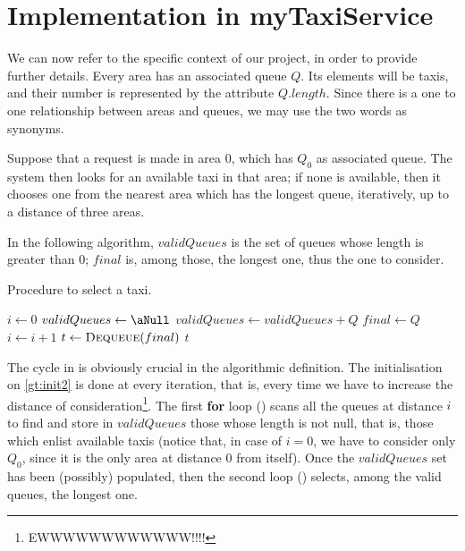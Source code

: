 \clearpage

\section{Implementation in myTaxiService}
We can now refer to the specific context of our project, in order to provide further details. Every area has an associated queue $Q$. Its elements will be taxis, and their number is represented by the attribute $Q.length$. Since there is a one to one relationship between areas and queues, we may use the two words as synonyms.

Suppose that a request is made in area $0$, which has $Q_0$ as associated queue. The system then looks for an available taxi in that area; if none is available, then it chooses one from the nearest area which has the longest queue, iteratively, up to a distance of three areas.

In the following algorithm, $validQueues$ is the set of queues whose length is greater than $0$; $final$ is, among those, the longest one, thus the one to consider.

\newcommand{\GetTaxi}{GetTaxi}

\begin{algorithm}
\caption{Procedure to select a taxi.} \label{alg:selectTaxi}
\begin{algorithmic}[1]
\Procedure{\GetTaxi}{$Q_0$}
	\State $i \gets 0$  %
	\Repeat \label{gt:repeat}
		\State $validQueues \gets \aNull$ \label{gt:init2}
		\label{gt:forValid}
				\State $validQueues \gets validQueues + Q$
			\EndIf
		\EndFor\label{gt:endForValid}
		\label{gt:forFinal}
				\State $final \gets Q$
			\EndIf
		\EndFor\label{gt:endForFinal}
		\State $i \gets i + 1$
	 \label{gt:until}
	\State $t \gets \Call{Dequeue}{final}$ 
	\State \Return $t$ 
\EndProcedure
\end{algorithmic}
\end{algorithm}

The cycle in  is obviously crucial in the algorithmic definition. The initialisation on \cref{gt:init2} is done at every iteration, that is, every time we have to increase {the distance of consideration}\footnote{EWWWWWWWWWWWW!!!!}. The first \textbf{for} loop () scans all the queues at distance $i$ to find and store in $validQueues$ those whose length is not null, that is, those which enlist available taxis (notice that, in case of $i=0$, we have to consider only $Q_0$, since it is the only area at distance $0$ from itself). Once the $validQueues$ set has been (possibly) populated, then the second loop () selects, among the valid queues, the longest one.

